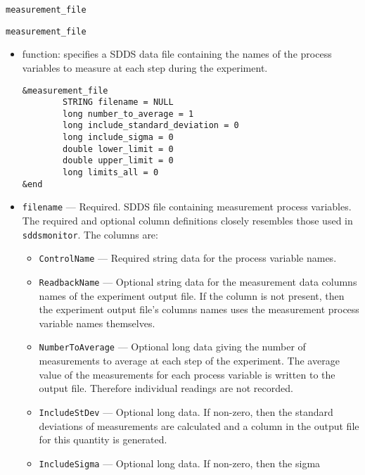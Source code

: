 \begin{itemize}
\begin{itemize}
\begin{latexonly}
\newpage\begin{center}{\Large \verb+measurement_file+}\end{center}
\end{latexonly}
\begin{htmlonly}
\item {\Large \verb+measurement_file+}
\end{htmlonly}
\begin{itemize}
        \item function: specifies a SDDS data file containing the names of
                 the process variables to measure at each step during the experiment.
\begin{verbatim}
&measurement_file
        STRING filename = NULL
        long number_to_average = 1
        long include_standard_deviation = 0
        long include_sigma = 0
        double lower_limit = 0
        double upper_limit = 0
        long limits_all = 0
&end
\end{verbatim}
        \item {\verb+filename+} --- Required. SDDS file containing measurement process variables.
                The required and optional column definitions closely resembles those used in {\verb+sddsmonitor+}.
                The columns are:
        \begin{itemize}
                \item {\verb+ControlName+} --- Required string data for the process variable names.
                \item {\verb+ReadbackName+} --- Optional string data for the measurement data
                columns names of the experiment output file. If the column is not present, then the
                experiment output file's columns names uses the measurement process variable names themselves.
                \item {\verb+NumberToAverage+} --- Optional long data giving the number of measurements
                to average at each step of the experiment. The average value of the measurements for each
                process variable is written to the output file. Therefore individual readings are not recorded.
                \item {\verb+IncludeStDev+} --- Optional long data. If non-zero, then the standard
                deviations of measurements are calculated and a column in the output file for this quantity
                is generated.
                \item {\verb+IncludeSigma+} --- Optional long data.  If non-zero, then the sigma

\end{itemize}
\end{itemize}
\end{itemize}
\end{itemize}
